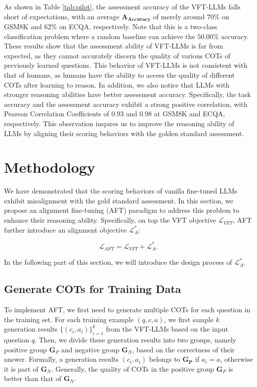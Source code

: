 As shown in Table \ref{tab:pilot}, the assessment accuracy of the VFT-LLMs falls short of expectations, with an average $\mathbf{A_{Accuracy}}$ of merely around $70\%$ on GSM8K and  $62\%$ on ECQA, respectively. Note that this is a two-class classification problem where a random baseline can achieve the $50.00\%$ accuracy. These results show that the assessment ability of VFT-LLMs is far from expected, as they cannot accurately discern the quality of various COTs of previously learned questions. This behavior of VFT-LLMs is not consistent with that of humans, as humans have the ability to access the quality of different COTs after learning to reason. In addition, we also notice that LLMs with stronger reasoning abilities have better assessment accuracy. Specifically, the task accuracy and the assessment accuracy exhibit a strong positive correlation, with Pearson Correlation Coefficients of 0.93 and 0.98 at GSM8K and ECQA, respectively. This observation inspires us to improve the reasoning ability of LLMs by aligning their scoring behaviors with the golden standard assessment.

\section{Methodology}
We have demonstrated that the scoring behaviors of vanilla fine-tuned LLMs exhibit misalignment with the gold standard assessment. In this section, we propose an alignment fine-tuning (AFT) paradigm to address this problem to enhance their reasoning ability. Specifically, on top the VFT objective $\mathcal{L}_{VFT}$, AFT further introduce an alignment objective $\mathcal{L}_{A}^*$:

\begin{equation}
    \mathcal{L}_{AFT} = \mathcal{L}_{VFT} + \mathcal{L}_{A}^{*}.
\end{equation}

In the following part of this section, we will introduce the design process of $\mathcal{L}_{A}^{*}$. 
\subsection{Generate COTs for Training Data}

\label{sec:gen}
To implement AFT, we first need to generate multiple COTs for each question in the training set. For each training example $(q, c, a)$, we first sample $k$ generation results $\{(c_i, a_i)\}_{i=1}^k$ from the VFT-LLMs based on the input question $q$. Then, we divide these generation results into two groups, namely positive group $\mathbf{G}_P$ and negative group $\mathbf{G}_N$, based on the correctness of their answer. Formally, a generation results $(c_i, a_i)$ belongs to $\mathbf{G_{P}}$ if $ a_i = a$, otherwise it is part of $\mathbf{G}_N$.
Generally, the quality of COTs in the positive group $\mathbf{G}_P$ is better than that of $\mathbf{G}_N$.

